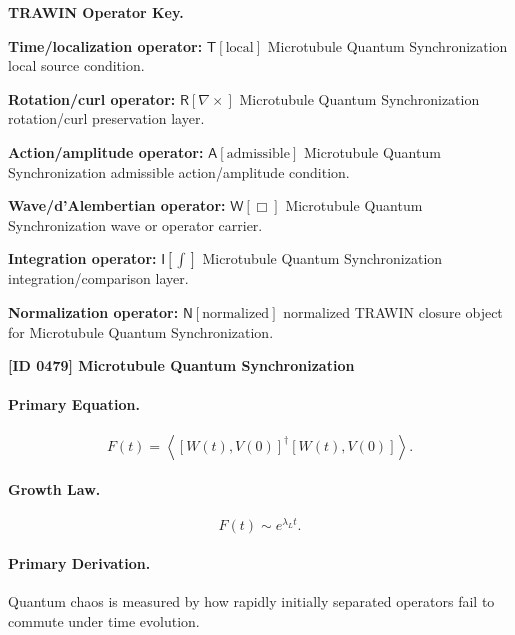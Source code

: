 \par\vspace{0.45\baselineskip}
\noindent\begin{minipage}[t]{\linewidth}
\begingroup
\small
\raggedright
\textbf{TRAWIN Operator Key.}\par
\noindent\textbf{Time/localization operator:} $\mathsf{T}\!\left[\mathrm{local}\right]$ Microtubule Quantum Synchronization local source condition.\par
\noindent\textbf{Rotation/curl operator:} $\mathsf{R}\!\left[\nabla\times\right]$ Microtubule Quantum Synchronization rotation/curl preservation layer.\par
\noindent\textbf{Action/amplitude operator:} $\mathsf{A}\!\left[\mathrm{admissible}\right]$ Microtubule Quantum Synchronization admissible action/amplitude condition.\par
\noindent\textbf{Wave/d'Alembertian operator:} $\mathsf{W}\!\left[\Box\right]$ Microtubule Quantum Synchronization wave or operator carrier.\par
\noindent\textbf{Integration operator:} $\mathsf{I}\!\left[\int\right]$ Microtubule Quantum Synchronization integration/comparison layer.\par
\noindent\textbf{Normalization operator:} $\mathsf{N}\!\left[\mathrm{normalized}\right]$ normalized TRAWIN closure object for Microtubule Quantum Synchronization.\par
\endgroup
\end{minipage}

\clearpage
\noindent\textbf{[ID 0479] Microtubule Quantum Synchronization}\par
\vspace{0.35em}
\paragraph{Primary Equation.}
\begin{equation}
F(t)
=
\left\langle
[W(t),V(0)]^\dagger
[W(t),V(0)]
\right\rangle .
\end{equation}

\paragraph{Growth Law.}
\begin{equation}
F(t)\sim e^{\lambda_L t}.
\end{equation}

\paragraph{Primary Derivation.}
Quantum chaos is measured by how rapidly initially separated operators fail to commute under time evolution.

